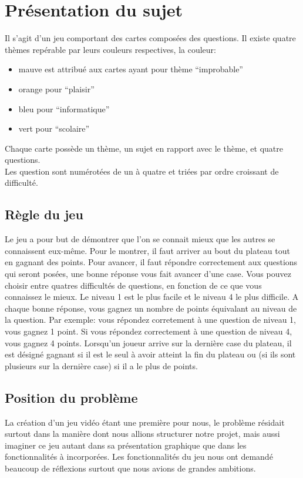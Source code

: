 \section{Présentation du sujet}
Il s'agit d'un jeu comportant des cartes composées des questions. Il existe quatre thèmes repérable par leurs couleurs respectives, la couleur:
\begin{itemize}
	\item mauve est attribué aux cartes ayant pour thème ``improbable''
	\item orange pour ``plaisir''
	\item bleu pour ``informatique''
	\item vert pour ``scolaire''
\end{itemize}
Chaque carte possède un thème, un sujet en rapport avec le thème, et quatre questions.\\
Les question sont numérotées de un à quatre et triées par ordre croissant de difficulté.
\subsection{Règle du jeu}
Le jeu a pour but de démontrer que l'on se connait mieux que les autres se connaissent eux-même.
Pour le montrer, il faut arriver au bout du plateau tout en gagnant des points.
Pour avancer, il faut répondre correctement aux questions qui seront posées, une bonne réponse vous fait avancer d'une case.
Vous pouvez choisir entre quatres difficultés de questions, en fonction de ce que vous connaissez le mieux. Le niveau 1 est le plus facile et le niveau 4 le plus difficile.
A chaque bonne réponse, vous gagnez un nombre de points équivalant au niveau de la question. Par exemple: vous répondez corretement à une question de niveau 1, vous gagnez 1 point. Si vous répondez correctement à une question de niveau 4, 
vous gagnez 4 points. Lorsqu'un joueur arrive sur la dernière case du plateau, il est désigné gagnant si il est le seul à avoir atteint la fin du plateau ou (si ils sont plusieurs sur la dernière case) si il a le plus de points. 

\subsection{Position du problème}
La création d'un jeu vidéo étant une première pour nous, le problème résidait surtout dans la manière dont nous allions structurer notre projet, mais aussi imaginer ce jeu autant dans sa présentation graphique que dans les fonctionnalités à incorporées.
Les fonctionnalités du jeu nous ont demandé beaucoup de réflexions surtout que nous avions de grandes ambitions.
